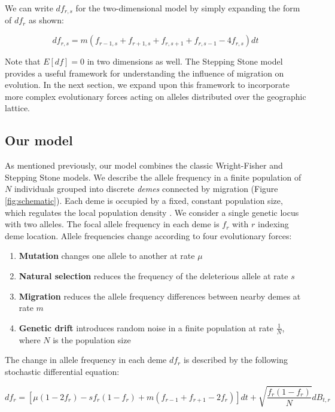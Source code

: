 We can write $df_{r,s}$ for the two-dimensional model by simply expanding the form of $df_r$ as shown:


\begin{equation} \label{eq:stepstone}
    df_{r,s} = m(f_{r-1,s} + f_{r+1,s} + f_{r,s+1} + f_{r,s-1} - 4f_{r,s})dt
\end{equation}


Note that $E[df] = 0$ in two dimensions as well. The Stepping Stone model provides a useful framework for understanding the influence of migration on evolution. In the next section, we expand upon this framework to incorporate more complex evolutionary forces acting on alleles distributed over the geographic lattice.  


\subsection{Our model} \label{"section:our_model"}

As mentioned previously, our model combines the classic Wright-Fisher and Stepping Stone models. We describe the allele frequency in a finite population of $N$ individuals grouped into discrete \textit{demes} connected by migration (Figure \ref{fig:schematic}). Each deme is occupied by a fixed, constant population size, which regulates the local population density \cite{felsenstein_1975}. We consider a single genetic locus with two alleles. The focal allele frequency in each deme is $f_r$ with $r$ indexing deme location. Allele frequencies change according to four evolutionary forces:


\begin{enumerate}
    \item \textbf{Mutation} changes one allele to another at rate $\mu$
    \item \textbf{Natural selection} reduces the frequency of the deleterious allele at rate $s$
    \item \textbf{Migration} reduces the allele frequency differences between nearby demes at rate $m$
    \item \textbf{Genetic drift} introduces random noise in a finite population at rate $\frac{1}{N}$, \\ where $N$ is the population size
\end{enumerate}


The change in allele frequency in each deme $df_r$ is described by the following stochastic differential equation:

\begin{equation}
    \label{eq:model}
    df_r=[\mu(1-2f_r)-sf_r (1-f_r ) + m (f_{r-1}+f_{r+1}-2f_r)]dt+\sqrt{\frac{f_r (1-f_r )}{N}} dB_{t,r}
\end{equation}


